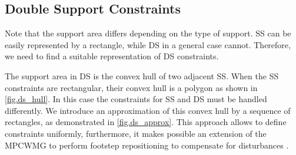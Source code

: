 \subsection{Double Support Constraints}
Note that the support area differs depending on the type of support. \ac{SS} can 
be easily represented by a rectangle, while \ac{DS} in a general case cannot. 
Therefore, we need to find a suitable representation of \ac{DS} constraints.

The support area in \ac{DS} is the convex hull of two adjacent \ac{SS}. When the 
\ac{SS} constraints are rectangular, their convex hull is a polygon as shown in 
\cref{fig.ds_hull}. In this case the constraints for \ac{SS} and \ac{DS} must 
be handled differently. We introduce an approximation of this convex hull by
a sequence of rectangles, as demonstrated in \cref{fig.ds_approx}. This approach
allows to define constraints uniformly, furthermore, it makes possible an 
extension of the \ac{MPCWMG} to perform footstep repositioning to compensate for
disturbances \cite{dimitrov2011walking}.
